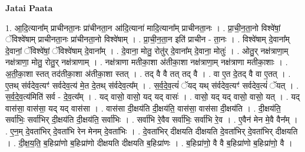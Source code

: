 \documentclass[17pt]{extarticle}
\begin{document}
\textbf{Jatai Paata} \newline

1. आ॒दि॒त्याना᳚म् प्राचीनता॒नः प्रा॑चीनता॒न आ॑दि॒त्याना॑ मादि॒त्याना᳚म् प्राचीनता॒नः । . प्रा॒ची॒न॒ता॒नो विश्वे॑षां॒ ॅविश्वे॑षाम् प्राचीनता॒नः प्रा॑चीनता॒नो विश्वे॑षाम् । . प्रा॒ची॒न॒ता॒न इति॑ प्राचीन - ता॒नः । . विश्वे॑षाम् दे॒वाना᳚म् दे॒वानां॒ ॅविश्वे॑षां॒ ॅविश्वे॑षाम् दे॒वाना᳚म् । . दे॒वाना॒ मोतु॒ रोतु॑र् दे॒वाना᳚म् दे॒वाना॒ मोतुः॑ । . ओतु॒र् नक्ष॑त्राणा॒म् नक्ष॑त्राणा॒ मोतु॒ रोतु॒र् नक्ष॑त्राणाम् । . नक्ष॑त्राणा मतीका॒शा अ॑तीका॒शा नक्ष॑त्राणा॒म् नक्ष॑त्राणा मतीका॒शाः । . अ॒ती॒का॒शा स्तत् तद॑तीका॒शा अ॑तीका॒शा स्तत् । . तद् वै वै तत् तद् वै । . वा ए॒त दे॒तद् वै वा ए॒तत् । . ए॒तथ् स॑र्वदेव॒त्यꣳ॑ सर्वदेव॒त्य॑ मे॒त दे॒तथ् स॑र्वदेव॒त्य᳚म् । . स॒र्व॒दे॒व॒त्यं॑ ॅयद् यथ् स॑र्वदेव॒त्यꣳ॑ सर्वदेव॒त्यं॑ ॅयत् । . स॒र्व॒दे॒व॒त्य॑मिति॑ सर्व - दे॒व॒त्य᳚म् । . यद् वासो॒ वासो॒ यद् यद् वासः॑ । . वासो॒ यद् यद् वासो॒ वासो॒ यत् । . यद् वास॑सा॒ वास॑सा॒ यद् यद् वास॑सा । . वास॑सा दी॒क्षय॑ति दी॒क्षय॑ति॒ वास॑सा॒ वास॑सा दी॒क्षय॑ति । . दी॒क्षय॑ति॒ सर्वा॑भिः॒ सर्वा॑भिर् दी॒क्षय॑ति दी॒क्षय॑ति॒ सर्वा॑भिः । . सर्वा॑भि रे॒वैव सर्वा॑भिः॒ सर्वा॑भि रे॒व । . ए॒वैन॑ मेन मे॒वै वैन᳚म् । . ए॒न॒म् दे॒वता॑भिर् दे॒वता॑भि रेन मेनम् दे॒वता॑भिः । . दे॒वता॑भिर् दीक्षयति दीक्षयति दे॒वता॑भिर् दे॒वता॑भिर् दीक्षयति । . दी॒क्ष॒य॒ति॒ ब॒हिःप्रा॑णो ब॒हिःप्रा॑णो दीक्षयति दीक्षयति ब॒हिःप्रा॑णः । . ब॒हिःप्रा॑णो॒ वै वै ब॒हिःप्रा॑णो ब॒हिःप्रा॑णो॒ वै । \newline
\end{document}
